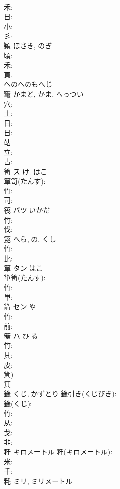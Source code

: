 \documentclass[8pt]{extreport}
\begin{document}
\begin{CJK}{UTF8}{min}
\\	禾: 
\\	日: 
\\	小: 
\\	彡: 
\\	穎		ほさき, のぎ				
\\	頃: 
\\	禾: 
\\	頁: 
\\	へのへのもへじ
\\	竃		かまど, かま, へっつい				
\\	穴: 
\\	土: 
\\	日: 
\\	日: 
\\	站						
\\	立: 
\\	占: 
\\	笥	ス	け, はこ		
\\	箪笥(たんす): 
\\	竹: 
\\	司: 
\\	筏	バツ	いかだ		
\\	竹: 
\\	伐: 
\\	箆		へら, の, くし				
\\	竹: 
\\	比: 
\\	箪	タン	はこ		
\\	箪笥(たんす): 
\\	竹: 
\\	単: 
\\	箭	セン	や		
\\	竹: 
\\	前: 
\\	簸	ハ	ひ.る		
\\	竹: 
\\	其: 
\\	皮: 
\\	箕) 
\\	箕 
\\	籤		くじ, かずとり			籤引き(くじびき): 
\\	籤(くじ): 
\\	竹: 
\\	从: 
\\	戈: 
\\	韭: 
\\	粁		キロメートル			粁(キロメートル): 
\\	米: 
\\	千: 
\\	粍		ミリ, ミリメートル				

\end{CJK}
\end{document}
